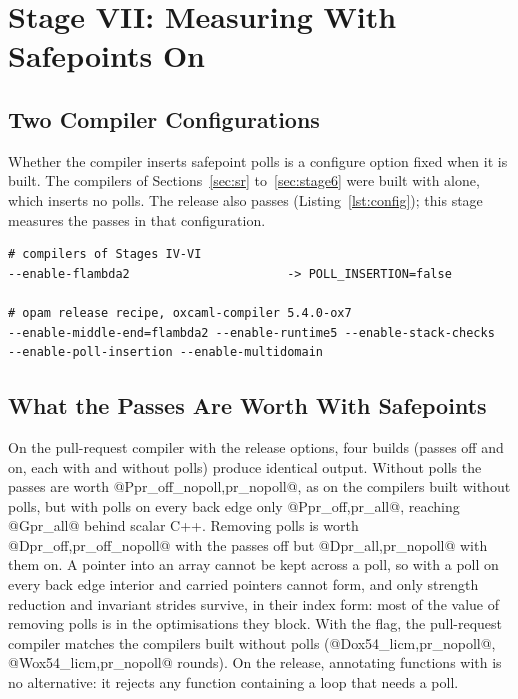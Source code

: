\section{Stage VII: Measuring With Safepoints On}
\label{sec:reality}

\subsection{Two Compiler Configurations}
Whether the compiler inserts safepoint polls is a configure option fixed when
it is built. The compilers of Sections~\ref{sec:sr} to~\ref{sec:stage6} were
built with  alone, which inserts no polls. The release
also passes  (Listing~\ref{lst:config}); this
stage measures the passes in that configuration.

\begin{lstlisting}[language=plaintext,caption={Configure options of the compilers of Stages IV--VI (top) and of the opam OxCaml release (bottom).},label=lst:config,numbers=none]
# compilers of Stages IV-VI
--enable-flambda2                      -> POLL_INSERTION=false

# opam release recipe, oxcaml-compiler 5.4.0-ox7
--enable-middle-end=flambda2 --enable-runtime5 --enable-stack-checks
--enable-poll-insertion --enable-multidomain
\end{lstlisting}

\subsection{What the Passes Are Worth With Safepoints}
\label{tab:pollladder}
On the pull-request compiler with the release options, four builds (passes
off and on, each with and without polls) produce identical output. Without
polls the
passes are worth @P{pr_off_nopoll,pr_nopoll}@, as on the compilers built
without polls, but with polls on every back edge only
@P{pr_off,pr_all}@, reaching @G{pr_all}@ behind scalar C++. Removing polls is
worth @D{pr_off,pr_off_nopoll}@ with the passes off but @D{pr_all,pr_nopoll}@
with them on. A pointer into an
array cannot be kept across a poll, so with a poll on every back edge interior
and carried pointers cannot form, and only strength reduction and invariant
strides survive, in their index form: most of the value of removing polls is
in the optimisations they block. With the flag, the pull-request compiler
matches the compilers built without polls (@D{ox54_licm,pr_nopoll}@,
@W{ox54_licm,pr_nopoll}@ rounds). On the release, annotating functions with
 is no alternative: it rejects any function containing a
loop that needs a poll.

